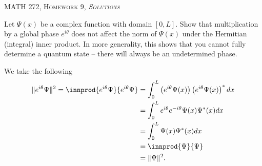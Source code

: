\documentclass[12pt]{article} %
\begin{document}
\begin{center}
   \textsc{\large MATH 272, Homework 9, \emph{Solutions}}\\
\end{center}
\vspace{.5cm}

\newpage
\begin{problem}
	Let $\Psi(x)$ be a complex function with domain $[0,L]$.  Show that multiplication by a global phase $e^{i\theta}$ does not affect the norm of $\Psi(x)$ under the Hermitian (integral) inner product. In more generality, this shows that you cannot fully determine a quantum state -- there will always be an undetermined phase.
\end{problem}
\begin{solution}
	We take the following
	\begin{align*}
		\|e^{i\theta} \Psi\|^2=\innprod{e^{i\theta}\Psi}{e^{i\theta}\Psi} &= \int_0^L \left(e^{i\theta}\Psi(x)\right)\left(e^{i\theta}\Psi(x)\right)^*dx\\
		&= \int_0^L e^{i\theta}e^{-i\theta} \Psi(x)\Psi^*(x)dx\\
		&= \int_0^L \Psi(x)\Psi^*(x)dx\\
		&= \innprod{\Psi}{\Psi}\\
		&= \|\Psi\|^2.
	\end{align*}
\end{solution}
\end{document}
